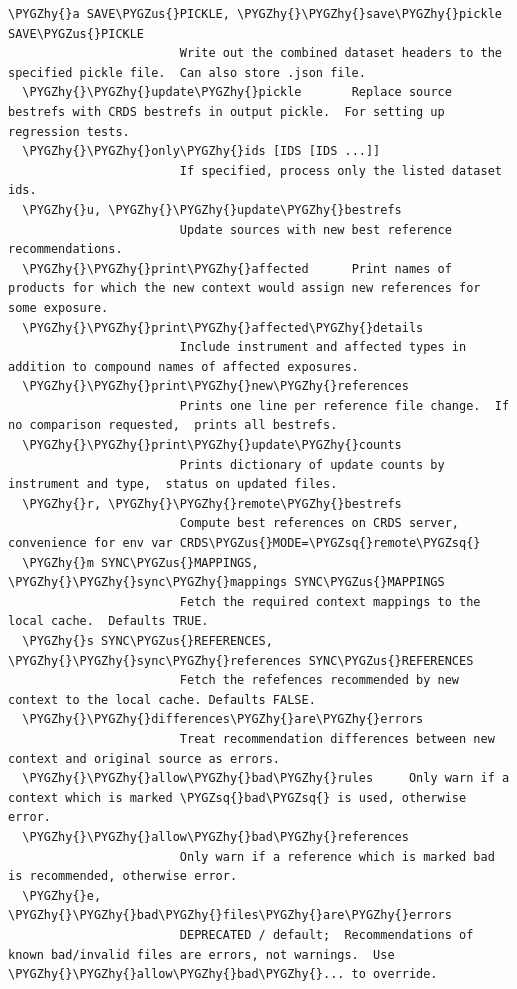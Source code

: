 \documentclass[letterpaper,10pt,english]{sphinxmanual}
\def\PYGZus{\char`\_}
\def\PYGZhy{\char`\-}
\def\PYGZsq{\char`\'}
\renewcommand\PYGZsq{\textquotesingle}
\begin{document}
\begin{Verbatim}[commandchars=\\\{\}]
  \PYGZhy{}a SAVE\PYGZus{}PICKLE, \PYGZhy{}\PYGZhy{}save\PYGZhy{}pickle SAVE\PYGZus{}PICKLE
                        Write out the combined dataset headers to the specified pickle file.  Can also store .json file.
  \PYGZhy{}\PYGZhy{}update\PYGZhy{}pickle       Replace source bestrefs with CRDS bestrefs in output pickle.  For setting up regression tests.
  \PYGZhy{}\PYGZhy{}only\PYGZhy{}ids [IDS [IDS ...]]
                        If specified, process only the listed dataset ids.
  \PYGZhy{}u, \PYGZhy{}\PYGZhy{}update\PYGZhy{}bestrefs
                        Update sources with new best reference recommendations.
  \PYGZhy{}\PYGZhy{}print\PYGZhy{}affected      Print names of products for which the new context would assign new references for some exposure.
  \PYGZhy{}\PYGZhy{}print\PYGZhy{}affected\PYGZhy{}details
                        Include instrument and affected types in addition to compound names of affected exposures.
  \PYGZhy{}\PYGZhy{}print\PYGZhy{}new\PYGZhy{}references
                        Prints one line per reference file change.  If no comparison requested,  prints all bestrefs.
  \PYGZhy{}\PYGZhy{}print\PYGZhy{}update\PYGZhy{}counts
                        Prints dictionary of update counts by instrument and type,  status on updated files.
  \PYGZhy{}r, \PYGZhy{}\PYGZhy{}remote\PYGZhy{}bestrefs
                        Compute best references on CRDS server,  convenience for env var CRDS\PYGZus{}MODE=\PYGZsq{}remote\PYGZsq{}
  \PYGZhy{}m SYNC\PYGZus{}MAPPINGS, \PYGZhy{}\PYGZhy{}sync\PYGZhy{}mappings SYNC\PYGZus{}MAPPINGS
                        Fetch the required context mappings to the local cache.  Defaults TRUE.
  \PYGZhy{}s SYNC\PYGZus{}REFERENCES, \PYGZhy{}\PYGZhy{}sync\PYGZhy{}references SYNC\PYGZus{}REFERENCES
                        Fetch the refefences recommended by new context to the local cache. Defaults FALSE.
  \PYGZhy{}\PYGZhy{}differences\PYGZhy{}are\PYGZhy{}errors
                        Treat recommendation differences between new context and original source as errors.
  \PYGZhy{}\PYGZhy{}allow\PYGZhy{}bad\PYGZhy{}rules     Only warn if a context which is marked \PYGZsq{}bad\PYGZsq{} is used, otherwise error.
  \PYGZhy{}\PYGZhy{}allow\PYGZhy{}bad\PYGZhy{}references
                        Only warn if a reference which is marked bad is recommended, otherwise error.
  \PYGZhy{}e, \PYGZhy{}\PYGZhy{}bad\PYGZhy{}files\PYGZhy{}are\PYGZhy{}errors
                        DEPRECATED / default;  Recommendations of known bad/invalid files are errors, not warnings.  Use \PYGZhy{}\PYGZhy{}allow\PYGZhy{}bad\PYGZhy{}... to override.

\end{Verbatim}
\end{document}

